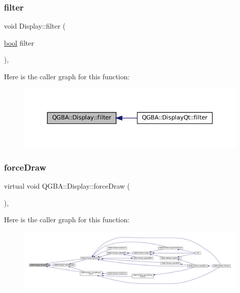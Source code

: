 \subsubsection{\texorpdfstring{filter}{filter}}
{\footnotesize\ttfamily void Display\+::filter (\begin{DoxyParamCaption}\item[{\mbox{\hyperlink{libretro_8h_a4a26dcae73fb7e1528214a068aca317e}{bool}}}]{filter }\end{DoxyParamCaption})\hspace{0.3cm}{\ttfamily [virtual]}, {\ttfamily [slot]}}

Here is the caller graph for this function\+:
\nopagebreak
\begin{figure}[H]
\begin{center}
\leavevmode
\includegraphics[width=350pt]{class_q_g_b_a_1_1_display_a222d135f71325371e9ba824e0f00370f_icgraph}
\end{center}
\end{figure}
\mbox{\label{class_q_g_b_a_1_1_display_adf2115268d351928e9aea504f9fcf0c7}} 
\subsubsection{\texorpdfstring{force\+Draw}{forceDraw}}
{\footnotesize\ttfamily virtual void Q\+G\+B\+A\+::\+Display\+::force\+Draw (\begin{DoxyParamCaption}{ }\end{DoxyParamCaption})\hspace{0.3cm}{\ttfamily [pure virtual]}, {\ttfamily [slot]}}

Here is the caller graph for this function\+:
\nopagebreak
\begin{figure}[H]
\begin{center}
\leavevmode
\includegraphics[width=350pt]{class_q_g_b_a_1_1_display_adf2115268d351928e9aea504f9fcf0c7_icgraph}
\end{center}
\end{figure}
\mbox{\label{class_q_g_b_a_1_1_display_ac60ec1f613bd782165ba3bdbe14d9439}} 
